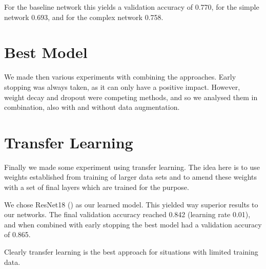 \documentclass[sigconf,nonacm]{acmart}
\begin{document}
For the baseline network this yields a validation accuracy
of 0.770, for the simple network 0.693, and for the
complex network 0.758.

\section{Best Model}

We made then various experiments with combining the
approaches.
Early stopping was always taken, as it can only have
a positive impact.
However, weight decay and dropout were competing
methods, and so we analysed them in combination,
also with and without data augmentation.

\section{Transfer Learning}

Finally we made some experiment using transfer
learning.
The idea here is to use weights established from training
of larger data sets and to amend these weights with
a set of final layers which are trained for the purpose.

We chose ResNet18 (\cite{resnet18}) as our learned
model.
This yielded way superior results to our networks.
The final validation accuracy reached 0.842 (learning
rate 0.01), and when combined with early stopping the best
model had a validation accuracy of 0.865.

Clearly transfer learning is the best approach for
situations with limited training data.



\end{document}
